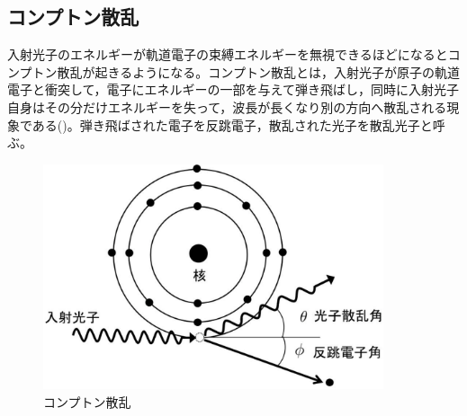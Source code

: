 \subsection{コンプトン散乱}
入射光子のエネルギーが軌道電子の束縛エネルギーを無視できるほどになるとコンプトン散乱が起きるようになる。コンプトン散乱とは，入射光子が原子の軌道電子と衝突して，電子にエネルギーの一部を与えて弾き飛ばし，同時に入射光子自身はその分だけエネルギーを失って，波長が長くなり別の方向へ散乱される現象である()。弾き飛ばされた電子を反跳電子，散乱された光子を散乱光子と呼ぶ。

\begin{figure}[H]
 \begin{center}
 \includegraphics[width=10cm]{image/other/compton.eps}
 \end{center}
 \caption{コンプトン散乱}
 \label{fig:comp_geo}
\end{figure}

